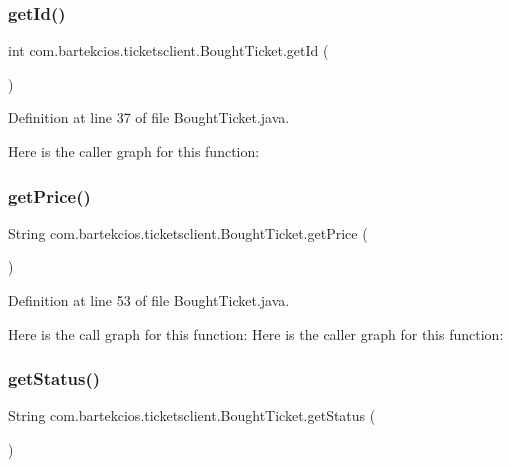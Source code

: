 \subsubsection{\texorpdfstring{get\+Id()}{getId()}}
{\footnotesize\ttfamily int com.\+bartekcios.\+ticketsclient.\+Bought\+Ticket.\+get\+Id (\begin{DoxyParamCaption}{ }\end{DoxyParamCaption})}



Definition at line 37 of file Bought\+Ticket.\+java.

Here is the caller graph for this function\+:
\mbox{\label{classcom_1_1bartekcios_1_1ticketsclient_1_1_bought_ticket_acaa76bbbfad27552e7486f8b09c3045a}} 
\subsubsection{\texorpdfstring{get\+Price()}{getPrice()}}
{\footnotesize\ttfamily String com.\+bartekcios.\+ticketsclient.\+Bought\+Ticket.\+get\+Price (\begin{DoxyParamCaption}{ }\end{DoxyParamCaption})}



Definition at line 53 of file Bought\+Ticket.\+java.

Here is the call graph for this function\+:
Here is the caller graph for this function\+:
\mbox{\label{classcom_1_1bartekcios_1_1ticketsclient_1_1_bought_ticket_a1d031a2a46e6f0cc55b127e0e9544527}} 
\subsubsection{\texorpdfstring{get\+Status()}{getStatus()}}
{\footnotesize\ttfamily String com.\+bartekcios.\+ticketsclient.\+Bought\+Ticket.\+get\+Status (\begin{DoxyParamCaption}{ }\end{DoxyParamCaption})}




